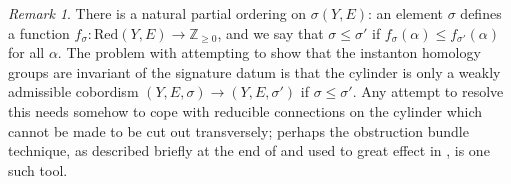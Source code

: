 \documentclass[10pt,a4paper]{amsart}
\theoremstyle{definition}
\theoremstyle{remark}
\newtheorem{remark}[theorem]{Remark}
\numberwithin{figure}{qchap}
\begin{document}
\begin{remark}There is a natural partial ordering on $\sigma(Y,E)$: an element $\sigma$ defines a function $f_\sigma: \text{Red}(Y, E) \to \mathbb Z_{\geq 0}$, and we say that $\sigma \leq \sigma'$ if $f_\sigma(\alpha) \leq f_{\sigma'}(\alpha)$ for all $\alpha$. The problem with attempting to show that the instanton homology groups are invariant of the signature datum is that the cylinder is only a weakly admissible cobordism $(Y, E, \sigma) \to (Y, E, \sigma')$ if $\sigma \leq \sigma'$. Any attempt to resolve this needs somehow to cope with reducible connections on the cylinder which cannot be made to be cut out transversely; perhaps the obstruction bundle technique, as described briefly at the end of \cite{Don} and used to great effect in \cite{taubes1984self}, is one such tool.
\end{remark}
\end{document}
